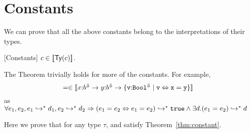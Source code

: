 \section{Constants}

We can prove that all the above constants belong to the 
interpretations of their types.
%
\begin{theorem}{[Constants]}\label{thm:constant}
$c \in [\![\mathsf{Ty}(c)]\!]$.
\end{theorem} 
%
The Theorem trivially holds for more of the constants.
For example, 
\newcommand\eqtype{\ensuremath{
	\tfun{x}{b^\lfinite}{
	\tfun{y}{b^\lfinite}{
	\tlref{v}{\tbool}{\lfinite}{v \Leftrightarrow x = y}
	}}
}}
$$= \in \interp{\eqtype}$$
as $\forall e_1, e_2, e_1 \hookrightarrow_{}^{*} d_1, e_2 \hookrightarrow_{}^{*} d_2\Rightarrow 
			(e_1=e_2 \Leftrightarrow e_1= e_2) \hookrightarrow_{}^{*} \mathtt{true}
			\land \exists d. (e_1 = e_2) \hookrightarrow_{}^{*} d$

Here we prove that for any type $\tau$, 
\efix{\tau} and \etfix{\tau} satisfy Theorem~\ref{thm:constant}.


